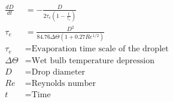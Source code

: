 \documentclass[fleqn, oneside, 11pt]{article}
\begin{document}
\begin{preview}
\begin{align*}
\frac{dD}{dt} & = -\frac{D}{2\tau_{e}\left(1-\frac{t}{\tau_{e}}\right)} \nonumber \\
\tau_{e} & = \frac{D^{2}}{84.76\Delta\Theta\left(1+0.27Re^{1/2}\right)} \nonumber \\
\tau_{e} & =  \text{Evaporation time scale of the droplet} \nonumber \\
\Delta\Theta & =  \text{Wet bulb temperature depression} \nonumber \\
D & = \text{Drop diameter} \nonumber \\
Re & = \text{Reynolds number} \nonumber \\
t & = \text{Time} \nonumber \\
\end{align*} 
\end{preview}
\end{document}
